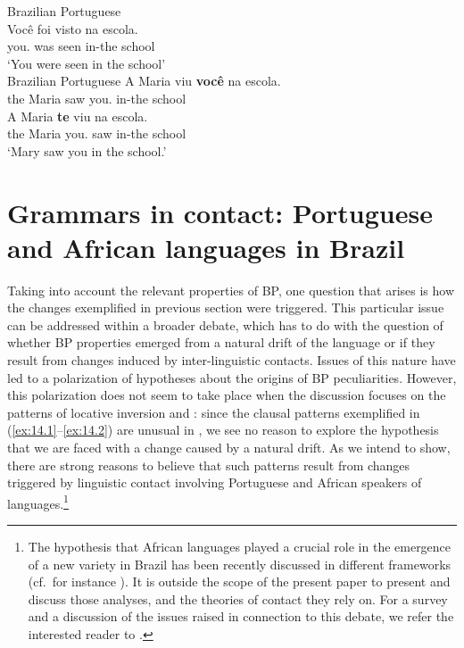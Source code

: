 \documentclass[output=paper]{langsci/langscibook}
\begin{document}
\ea%
    \label{ex:14.7}Brazilian Portuguese\\
    \gll    Você foi visto na escola.\\
            you.\Nom{} was seen in-the school\\
    \glt    ‘You were seen in the school’\\
\ex%
    \label{ex:14.8}Brazilian Portuguese
	\ea
	\gll    A Maria viu \textbf{você} na escola.\\
            the Maria saw you.\Nom{} in-the school\\
    \ex
    \gll    A Maria \textbf{te} viu na escola.\\
            the Maria you.\Acc{} saw in-the school\\
    \glt    ‘Mary saw you in the school.’
    \z
\z

\section{Grammars in contact: Portuguese and African languages in
Brazil}\label{sec:14.3}

Taking into account the relevant properties of BP, one question that arises is
how the changes exemplified in previous section were triggered. This particular
issue can be addressed within a broader debate, which has to do with the
question of whether \gls{BP} properties emerged from a natural drift of the
language or if they result from changes induced by inter-linguistic contacts.
Issues of this nature have led to a polarization of hypotheses about the
origins of \gls{BP} peculiarities. However, this polarization does not seem to
take place when the discussion focuses on the patterns of locative inversion
and : since the clausal patterns exemplified in
(\ref{ex:14.1}--\ref{ex:14.2}) are unusual in , we see no reason
to explore the hypothesis that we are faced with a change caused by a natural
drift. As we intend to show, there are strong reasons to believe that such
patterns result from changes triggered by linguistic contact involving
Portuguese and African speakers of  languages.\footnote{The hypothesis
    that African languages played a crucial role in the emergence of a new
    variety in Brazil has been recently discussed in different frameworks (cf.\
    for instance \citealt{NegraoViotti2011}). It is outside the scope of
    the present paper to present and discuss those analyses, and the theories
    of contact they rely on. For a survey and a discussion of the issues raised
in connection to this debate, we refer the interested reader to
\citet{AvelarGalves2014}.}
\end{document}
